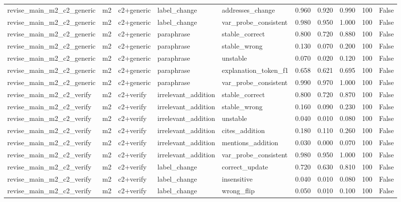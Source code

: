 \begin{tabular}{llllllllll}
revise\_main\_m2\_c2\_generic & m2 & c2+generic & label\_change & addresses\_change & 0.960 & 0.920 & 0.990 & 100 & False \\
revise\_main\_m2\_c2\_generic & m2 & c2+generic & label\_change & var\_probe\_consistent & 0.980 & 0.950 & 1.000 & 100 & False \\
revise\_main\_m2\_c2\_generic & m2 & c2+generic & paraphrase & stable\_correct & 0.800 & 0.720 & 0.880 & 100 & False \\
revise\_main\_m2\_c2\_generic & m2 & c2+generic & paraphrase & stable\_wrong & 0.130 & 0.070 & 0.200 & 100 & False \\
revise\_main\_m2\_c2\_generic & m2 & c2+generic & paraphrase & unstable & 0.070 & 0.020 & 0.120 & 100 & False \\
revise\_main\_m2\_c2\_generic & m2 & c2+generic & paraphrase & explanation\_token\_f1 & 0.658 & 0.621 & 0.695 & 100 & False \\
revise\_main\_m2\_c2\_generic & m2 & c2+generic & paraphrase & var\_probe\_consistent & 0.990 & 0.970 & 1.000 & 100 & False \\
revise\_main\_m2\_c2\_verify & m2 & c2+verify & irrelevant\_addition & stable\_correct & 0.800 & 0.720 & 0.870 & 100 & False \\
revise\_main\_m2\_c2\_verify & m2 & c2+verify & irrelevant\_addition & stable\_wrong & 0.160 & 0.090 & 0.230 & 100 & False \\
revise\_main\_m2\_c2\_verify & m2 & c2+verify & irrelevant\_addition & unstable & 0.040 & 0.010 & 0.080 & 100 & False \\
revise\_main\_m2\_c2\_verify & m2 & c2+verify & irrelevant\_addition & cites\_addition & 0.180 & 0.110 & 0.260 & 100 & False \\
revise\_main\_m2\_c2\_verify & m2 & c2+verify & irrelevant\_addition & mentions\_addition & 0.030 & 0.000 & 0.070 & 100 & False \\
revise\_main\_m2\_c2\_verify & m2 & c2+verify & irrelevant\_addition & var\_probe\_consistent & 0.980 & 0.950 & 1.000 & 100 & False \\
revise\_main\_m2\_c2\_verify & m2 & c2+verify & label\_change & correct\_update & 0.720 & 0.630 & 0.810 & 100 & False \\
revise\_main\_m2\_c2\_verify & m2 & c2+verify & label\_change & insensitive & 0.040 & 0.010 & 0.080 & 100 & False \\
revise\_main\_m2\_c2\_verify & m2 & c2+verify & label\_change & wrong\_flip & 0.050 & 0.010 & 0.100 & 100 & False \\

\end{tabular}
